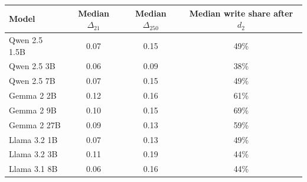 \begin{tabular}{@{}lccc@{}}
\toprule
Model & Median $\Delta_{21}$ & Median $\Delta_{250}$ & Median write share after $d_2$ \\
\midrule
Qwen 2.5 1.5B & 0.07 & 0.15 & 49\% \\
Qwen 2.5 3B & 0.06 & 0.09 & 38\% \\
Qwen 2.5 7B & 0.07 & 0.15 & 49\% \\
Gemma 2 2B & 0.12 & 0.16 & 61\% \\
Gemma 2 9B & 0.10 & 0.15 & 69\% \\
Gemma 2 27B & 0.09 & 0.13 & 59\% \\
Llama 3.2 1B & 0.07 & 0.13 & 49\% \\
Llama 3.2 3B & 0.11 & 0.19 & 44\% \\
Llama 3.1 8B & 0.06 & 0.16 & 44\% \\
\bottomrule
\end{tabular}
